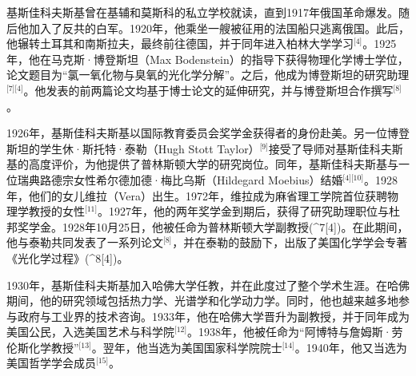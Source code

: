 基斯佳科夫斯基曾在基辅和莫斯科的私立学校就读，直到1917年俄国革命爆发。随后他加入了反共的白军。1920年，他乘坐一艘被征用的法国船只逃离俄国。此后，他辗转土耳其和南斯拉夫，最终前往德国，并于同年进入柏林大学学习\(^\text{[4]}\)。1925年，他在马克斯·博登斯坦（Max Bodenstein）的指导下获得物理化学博士学位，论文题目为“氯一氧化物与臭氧的光化学分解”。之后，他成为博登斯坦的研究助理\(^\text{[7][4]}\)。他发表的前两篇论文均基于博士论文的延伸研究，并与博登斯坦合作撰写\(^\text{[8]}\)。

1926年，基斯佳科夫斯基以国际教育委员会奖学金获得者的身份赴美。另一位博登斯坦的学生休·斯托特·泰勒（Hugh Stott Taylor）\(^\text{[9]}\)接受了导师对基斯佳科夫斯基的高度评价，为他提供了普林斯顿大学的研究岗位。同年，基斯佳科夫斯基与一位瑞典路德宗女性希尔德加德·梅比乌斯（Hildegard Moebius）结婚\(^\text{[4][10]}\)。1928年，他们的女儿维拉（Vera）出生。1972年，维拉成为麻省理工学院首位获聘物理学教授的女性\(^\text{[11]}\)。1927年，他的两年奖学金到期后，获得了研究助理职位与杜邦奖学金。1928年10月25日，他被任命为普林斯顿大学副教授(^7[4])。在此期间，他与泰勒共同发表了一系列论文\(^\text{[8]}\)，并在泰勒的鼓励下，出版了美国化学学会专著《光化学过程》(^8[4])。

1930年，基斯佳科夫斯基加入哈佛大学任教，并在此度过了整个学术生涯。在哈佛期间，他的研究领域包括热力学、光谱学和化学动力学。同时，他也越来越多地参与政府与工业界的技术咨询。1933年，他在哈佛大学晋升为副教授，并于同年成为美国公民，入选美国艺术与科学院\(^\text{[12]}\)。1938年，他被任命为“阿博特与詹姆斯·劳伦斯化学教授”\(^\text{[13]}\)。翌年，他当选为美国国家科学院院士\(^\text{[14]}\)。1940年，他又当选为美国哲学学会成员\(^\text{[15]}\)。
